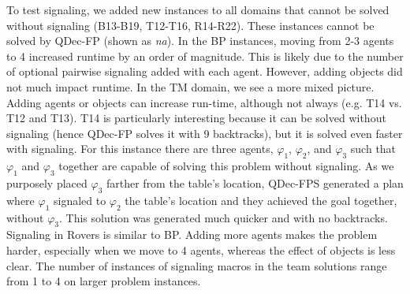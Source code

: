 \documentclass[letterpaper]{article} %
\theoremstyle{definition}
\begin{document}
To test signaling, we added new instances to all domains that cannot be solved without signaling (B13-B19, T12-T16, R14-R22). These instances cannot be solved
by QDec-FP (shown as \emph{na}).
In the BP instances, moving from 2-3 agents to 4 increased runtime by an order of magnitude. This is likely due to the number of optional pairwise signaling added with each agent. However, adding objects did not much impact runtime.
In the TM domain, we see a more mixed picture. Adding agents or objects can increase run-time, although not always (e.g. T14 vs. T12 and T13).
T14 is particularly interesting because it can be solved without signaling (hence QDec-FP solves it with 9 backtracks), but it is solved even faster with signaling.
For this instance there are three agents, $\varphi_1$, $\varphi_2$, and $\varphi_3$ such that $\varphi_1$ and $\varphi_3$ together are capable of solving this problem without signaling.
As we purposely placed $\varphi_3$ farther from the table's location, QDec-FPS generated a plan where $\varphi_1$ signaled to $\varphi_2$ the table's location and they achieved the goal together, without $\varphi_3$. This solution was generated much quicker and with no backtracks.
Signaling in Rovers is similar to BP.
Adding more agents makes the problem harder,
especially when we move to 4 agents, whereas the effect of objects is less clear.
The number of instances of signaling macros in the team solutions range from 1 to 4 on larger problem instances.
\end{document}

